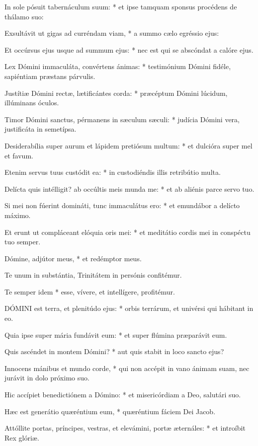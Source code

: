 In sole pósuit tabernáculum suum: * et ipse tamquam sponsus procédens de thálamo suo:

Exsultávit ut gigas ad curréndam viam, * a summo cælo egréssio ejus:

Et occúrsus ejus usque ad summum ejus: * nec est qui se abscóndat a calóre ejus.

Lex Dómini immaculáta, convértens ánimas: * testimónium Dómini fidéle, sapiéntiam præstans párvulis.

Justítiæ Dómini rectæ, lætificántes corda: * præcéptum Dómini lúcidum, illúminans óculos.

Timor Dómini sanctus, pérmanens in sæculum sæculi: * judícia Dómini vera, justificáta in semetípsa.

Desiderabília super aurum et lápidem pretiósum multum: * et dulcióra super mel et favum.

Etenim servus tuus custódit ea: * in custodiéndis illis retribútio multa.

Delícta quis intélligit? ab occúltis meis munda me: * et ab aliénis parce servo tuo.

Si mei non fúerint domináti, tunc immaculátus ero: * et emundábor a delícto máximo.

Et erunt ut compláceant elóquia oris mei: * et meditátio cordis mei in conspéctu tuo semper.

Dómine, adjútor meus, * et redémptor meus.

 Te unum in substántia, Trinitátem in persónis confitémur.

 Te semper idem * esse, vívere, et intellígere, profitémur.


\lettrine[lines=2]{D}{ÓMINI} est terra, et plenitúdo ejus: * orbis terrárum, et univérsi qui hábitant in eo.

Quia ipse super mária fundávit eum: * et super flúmina præparávit eum.

Quis ascéndet in montem Dómini? * aut quis stabit in loco sancto ejus?

Innocens mánibus et mundo corde, * qui non accépit in vano ánimam suam, nec jurávit in dolo próximo suo.

Hic accípiet benedictiónem a Dómino: * et misericórdiam a Deo, salutári suo.

Hæc est generátio quæréntium eum, * quæréntium fáciem Dei Jacob.

Attóllite portas, príncipes, vestras, et elevámini, portæ æternáles: * et introíbit Rex glóriæ.

